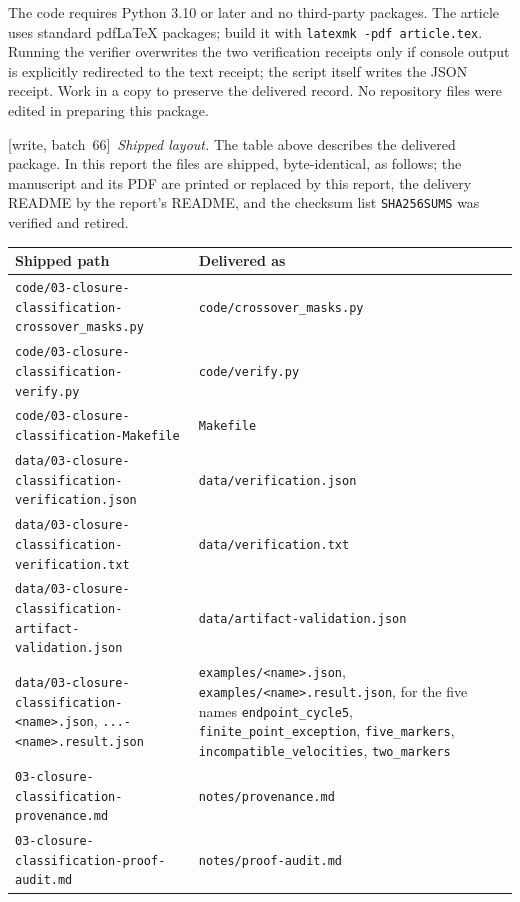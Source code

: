 \documentclass[11pt,letterpaper]{article}
\theoremstyle{definition}
\theoremstyle{remark}
\newcommand{\wsix}{\textup{[write, batch~66]}}
\begin{document}
The code requires Python 3.10 or later and no third-party packages.
The article uses standard pdf\LaTeX{} packages; build it with
\texttt{latexmk -pdf article.tex}. Running the verifier overwrites the two
verification receipts only if console output is explicitly redirected to
the text receipt; the script itself writes the JSON receipt. Work in a
copy to preserve the delivered record. No repository files were edited
in preparing this package.

\wsix\ \emph{Shipped layout.} The table above describes the delivered
package. In this report the files are shipped, byte-identical, as follows;
the manuscript and its PDF are printed or replaced by this report, the
delivery README by the report's README, and the checksum list
\texttt{SHA256SUMS} was verified and retired.
\begin{center}\footnotesize
\begin{tabular}{@{}P{.62\textwidth}P{.32\textwidth}@{}}
\toprule
\textbf{Shipped path} & \textbf{Delivered as}\\
\midrule
\nolinkurl{code/03-closure-classification-crossover_masks.py} & \texttt{code/crossover\_masks.py}\\
\nolinkurl{code/03-closure-classification-verify.py} & \texttt{code/verify.py}\\
\nolinkurl{code/03-closure-classification-Makefile} & \texttt{Makefile}\\
\nolinkurl{data/03-closure-classification-verification.json} & \texttt{data/verification.json}\\
\nolinkurl{data/03-closure-classification-verification.txt} & \texttt{data/verification.txt}\\
\nolinkurl{data/03-closure-classification-artifact-validation.json} & \texttt{data/artifact-validation.json}\\
\nolinkurl{data/03-closure-classification-<name>.json}, \nolinkurl{...-<name>.result.json} & \texttt{examples/<name>.json}, \texttt{examples/<name>.result.json}, for the five names \texttt{endpoint\_cycle5}, \texttt{finite\_point\_exception}, \texttt{five\_markers}, \texttt{incompatible\_velocities}, \texttt{two\_markers}\\
\nolinkurl{03-closure-classification-provenance.md} & \texttt{notes/provenance.md}\\
\nolinkurl{03-closure-classification-proof-audit.md} & \texttt{notes/proof-audit.md}\\
\bottomrule
\end{tabular}
\end{center}
\end{document}
